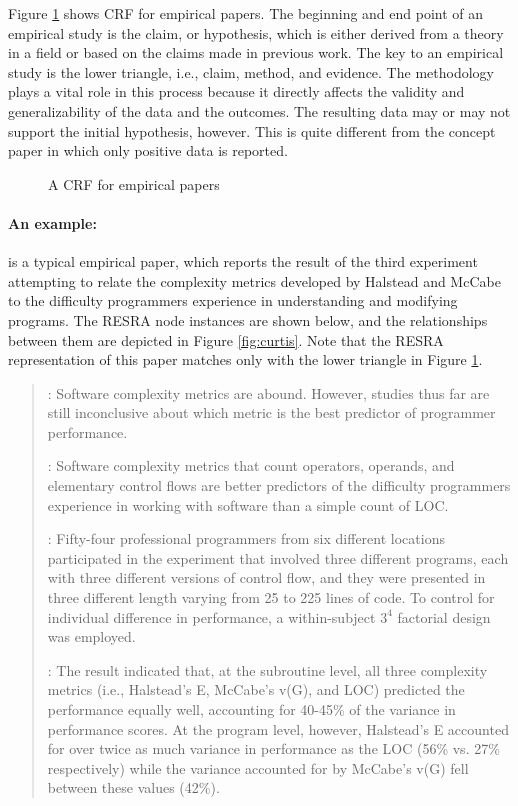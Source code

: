 Figure \ref{fig:empirical-crf} shows CRF for empirical papers. The
beginning and end point of an empirical study is the claim, or hypothesis,
which is either derived from a theory in a field or based on the claims
made in previous work. The key to an empirical study is the lower triangle,
i.e., claim, method, and evidence. The methodology plays a vital role in
this process because it directly affects the validity and generalizability
of the data and the outcomes. The resulting data may or may not support the
initial hypothesis, however. This is quite different from the concept paper
in which only positive data is reported.

\begin{figure}[htb]
  \caption{A CRF for empirical papers}
  \label{fig:empirical-crf}
\end{figure}


\paragraph{An example:}

\cite{Curtis79} is a typical empirical paper, which reports the result of
the third experiment attempting to relate the complexity metrics developed
by Halstead and McCabe to the difficulty programmers experience in
understanding and modifying programs. The RESRA node instances are shown
below, and the relationships between them are depicted in Figure
\ref{fig:curtis}. Note that the RESRA representation of this paper matches
only with the lower triangle in Figure \ref{fig:empirical-crf}.

\small
\begin{quotation}
  : Software complexity metrics are abound.
  However, studies thus far are still inconclusive about which metric is
  the best predictor of programmer performance.
  
  : Software complexity metrics that count
  operators, operands, and elementary control flows are better predictors
  of the difficulty programmers experience in working with software than a
  simple count of LOC.
  
  : Fifty-four professional programmers from six
  different locations participated in the experiment that involved three
  different programs, each with three different versions of control flow,
  and they were presented in three different length varying from 25 to 225
  lines of code. To control for individual difference in performance, a
  within-subject \( 3^4 \) factorial design was employed.
  
  : The result indicated that, at the subroutine
  level, all three complexity metrics (i.e., Halstead's E, McCabe's v(G),
  and LOC) predicted the performance equally well, accounting for 40-45\%
  of the variance in performance scores. At the program level, however,
  Halstead's E accounted for over twice as much variance in performance as
  the LOC (56\% vs. 27\% respectively) while the variance accounted for by
  McCabe's v(G) fell between these values (42\%). 
\end{quotation}
\normalsize

